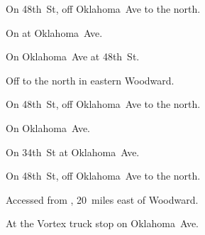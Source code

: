 
\begin{LocationList}

On 48th~St, off  Oklahoma~Ave to the north.

On   at  Oklahoma~Ave.

\Location{\GarageHQ \Garage}
On  Oklahoma~Ave at 48th~St.

Off  to the north in eastern Woodward.

On 48th~St, off  Oklahoma~Ave to the north.

On  Oklahoma~Ave.

\Location{\TruckService \Service}
On 34th~St at   Oklahoma~Ave.

On 48th~St, off  Oklahoma~Ave to the north.

Accessed from , 20~miles east of Woodward.

At the Vortex truck stop on   Oklahoma~Ave.

\end{LocationList}
